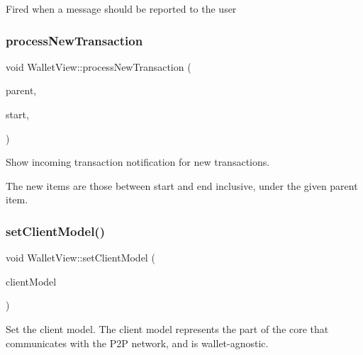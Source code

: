 Fired when a message should be reported to the user \mbox{\label{class_wallet_view_addde7d2260658ee06f47f9c095a8cb2a}} 
\subsubsection{\texorpdfstring{process\+New\+Transaction}{processNewTransaction}}
{\footnotesize\ttfamily void Wallet\+View\+::process\+New\+Transaction (\begin{DoxyParamCaption}\item[{const Q\+Model\+Index \&}]{parent,  }\item[{int}]{start,  }\item[{int}]{ }\end{DoxyParamCaption})\hspace{0.3cm}{\ttfamily [slot]}}

Show incoming transaction notification for new transactions.

The new items are those between start and end inclusive, under the given parent item. \mbox{\label{class_wallet_view_a46d9a8d93adfdcc29cae9ff0d44c313e}} 
\subsubsection{\texorpdfstring{set\+Client\+Model()}{setClientModel()}}
{\footnotesize\ttfamily void Wallet\+View\+::set\+Client\+Model (\begin{DoxyParamCaption}\item[{\mbox{\hyperlink{class_client_model}{Client\+Model}} $\ast$}]{client\+Model }\end{DoxyParamCaption})}

Set the client model. The client model represents the part of the core that communicates with the P2P network, and is wallet-\/agnostic. \mbox{\label{class_wallet_view_a0a37ff693a4f9c1e5ddc23f9cd3913be}} 
